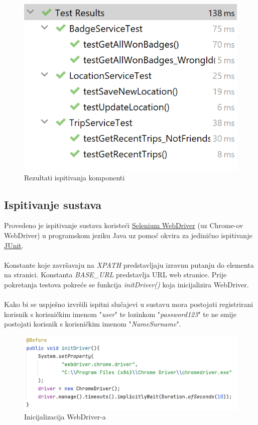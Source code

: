         \begin{figure}[H]
            \includegraphics[scale=1]{slike/unit_test_results.png} 
              \centering
            \caption{Rezultati ispitivanja komponenti}
        \end{figure}
        \eject
        
			
			\subsection{Ispitivanje sustava}
			
			 Provedeno je ispitivanje sustava koristeći \underline{\href{https://www.selenium.dev/}{Selenium WebDriver}} (uz Chrome-ov WebDriver) u programskom jeziku Java uz pomoć okvira za jedinično ispitivanje \underline{\href{https://junit.org/junit5/}{JUnit}}. 
            \\
            \\
            Konstante koje završavaju na \textit{XPATH} predstavljaju izravnu putanju do elementa na stranici. Konstanta \textit{{BASE\_URL}} predstavlja URL web stranice. Prije pokretanja testova pokreće se funkcija \textit{initDriver()} koja inicijalizira WebDriver. 
            \\
            \\
            Kako bi se uspješno izvršili ispitni slučajevi u sustavu mora postojati registrirani korisnik s korisničkim imenom "\textit{user}" te lozinkom "\textit{password123}" te ne smije postojati korisnik s korisničkim imenom "\textit{NameSurname}".

                \begin{figure}[H]
        		\includegraphics[scale=1]{slike/integration_test_init.png} 
        		  \centering
        		\caption{Inicijalizacija WebDriver-a}
        	\end{figure}

